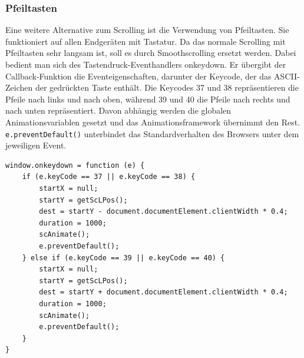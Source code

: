 \subsubsection{Pfeiltasten}
Eine weitere Alternative zum Scrolling ist die Verwendung von Pfeiltasten. Sie funktioniert auf allen Endgeräten mit Tastatur. Da das normale Scrolling mit Pfeiltasten sehr langsam ist, soll es durch Smoothscrolling ersetzt werden. Dabei bedient man sich des Tastendruck-Eventhandlers onkeydown. Er übergibt der Callback-Funktion die Eventeigenschaften, darunter der Keycode, der das ASCII-Zeichen der gedrückten Taste enthält. Die Keycodes 37 und 38 repräsentieren die Pfeile nach links und nach oben, während 39 und 40 die Pfeile nach rechts und nach unten repräsentiert. Davon abhängig werden die globalen Animationsvariablen gesetzt und das Animationsframework übernimmt den Rest. \lstinline{e.preventDefault()} unterbindet das Standardverhalten des Browsers unter dem jeweiligen Event.

 \begin{lstlisting}[caption=Abfangen des Tastendrücken durch das onkeydown-Event, label=js_onkeydown]
window.onkeydown = function (e) {
	if (e.keyCode == 37 || e.keyCode == 38) {
		startX = null;
		startY = getScLPos();
		dest = startY - document.documentElement.clientWidth * 0.4;
		duration = 1000;
		scAnimate();
		e.preventDefault();
	} else if (e.keyCode == 39 || e.keyCode == 40) {
		startX = null;
		startY = getScLPos();
		dest = startY + document.documentElement.clientWidth * 0.4;
		duration = 1000;
		scAnimate();
		e.preventDefault();
	}
}
\end{lstlisting} 
